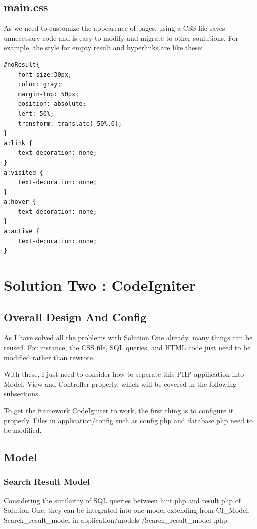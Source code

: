 \documentclass[a4paper]{article}
\begin{document}
        \subsection{main.css}
As we need to customize the appearence of pages, using a CSS file saves unnecessary code and is easy to modify and migrate to other soulutions. For example, the style for empty result and hyperlinks are like these:
                    \begin{verbatim}
#noResult{
    font-size:30px;
    color: gray;
    margin-top: 50px;
    position: absolute;
    left: 50%;
    transform: translate(-50%,0);
}
a:link {
    text-decoration: none;
}
a:visited {
    text-decoration: none;
}
a:hover {
    text-decoration: none;
}
a:active {
    text-decoration: none;
}
                    \end{verbatim}

    \section{Solution Two : CodeIgniter}
        \subsection{Overall Design And Config}
As I have solved all the problems with Solution One already, many things can be reused. For instance, the CSS file, SQL queries, and HTML code just need to be modified rather than rewrote.

With these, I just need to consider how to seperate this PHP appilication into Model, View and Controller properly, which will be covered in the following subsections.

To get the framework CodeIgniter to work, the first thing is to configure it properly. Files in application/config such as config.php and database.php need to be modified.

        \subsection{Model}
            \subsubsection{Search Result Model}
Considering the similarity of SQL queries between hint.php and result.php of Solution One, they can be integrated into one model extending from CI\_Model, Search\_result\_model in application/models /Search\_result\_model .php.
\end{document}
